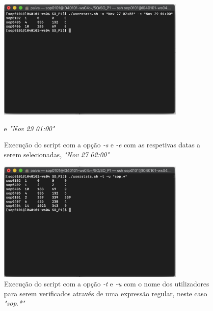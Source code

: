 \documentclass[10pt,portuguese]{article}
\begin{document}
\begin{figure}[!h]
    \centering
    \includegraphics[width=350]{Resultados/-s_-e.png}
    \caption{Execução do script com a opção \textit{-s} e \textit{-e} com as respetivas datas a serem selecionadas, \textit{"Nov 27 02:00"}} e \textit{"Nov 29 01:00"}
\end{figure}

\begin{figure}[!h]
    \centering
    \includegraphics[width=350]{Resultados/-t_-u.png}
    \caption{Execução do script com a opção \textit{-t} e \textit{-u} com o nome dos utilizadores para serem verificados através de uma expressão regular, neste caso \textit{"sop.*"}}
\end{figure}
\end{document}
